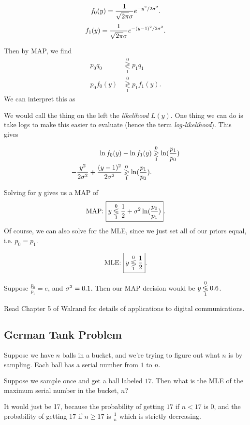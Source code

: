 \documentclass[11 pt]{scrartcl}
\begin{document}
\[ f_0(y) = \dfrac{1}{\sqrt{2\pi} \sigma}e^{-y^2/2\si^2}.\] 
\[ f_1(y) = \dfrac{1}{\sqrt{2\pi} \sigma}e^{-(y-1)^2/2\si^2}.\] 

Then by MAP, we find 
\begin{align*}
    p_0q_0 &\underset{{1}}{\overset{0}{\gtrless}} p_1q_1 \\ 
    p_0f_0(y) &\underset{{1}}{\overset{0}{\gtrless}} p_1f_1(y).
\end{align*}
We can interpret this as 

We would call the thing on the left the \emph{likelihood} $L(y)$. One thing we can do is take logs to make this easier to evaluate (hence the term \emph{log-likelihood}). This gives 

\begin{align*}
    \ln f_0(y) - \ln f_1(y) &\underset{{1}}{\overset{0}{\gtrless}} \ln(\frac{p_1}{p_0}) \\ 
    -\frac{y^2}{2\si^2} + \frac{(y-1)^2}{2\si^2} \grle{0}{1} \ln(\frac{p_1}{p_0}).
\end{align*}

Solving for $y$ gives us a MAP of 
\[ \text{MAP: } \boxed{y \legr{0}{1} \frac{1}{2} + \si^2\ln(\frac{p_0}{p_1})}.\] 
Of course, we can also solve for the MLE, since we just set all of our priors equal, i.e. $p_0 = p_1$. 

\[ \text{MLE: } \boxed{y \legr{0}{1} \frac{1}{2}}.\] 

\begin{example}
    Suppose $\frac{p_0}{p_1} = e$, and $\si^2 = 0.1$. Then our MAP decision would be $y\legr{0}{1} 0.6$.
\end{example}

Read Chapter 5 of Walrand for details of applications to digital communications. 

\subsection{German Tank Problem}
Suppose we have $n$ balls in a bucket, and we're trying to figure out what $n$ is by sampling. Each ball has a serial number from $1$ to $n$. 

Suppose we sample once and get a ball labeled $17$. Then what is the MLE of the maximum serial number in the bucket, $n$? 

It would just be 17, because the probability of getting $17$ if $n < 17$ is 0, and the probability of getting 17 if $n \geq 17$ is $\frac{1}{n}$ which is strictly decreasing.
\end{document}
